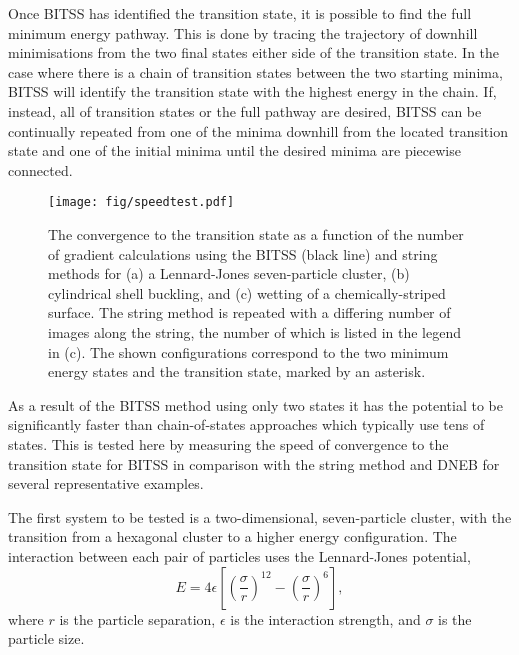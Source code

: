 \documentclass[aps,prl,twocolumn,10pt,groupedaddress]{revtex4-2}
\begin{document}
Once BITSS has identified the transition state, it is possible to find the full minimum energy pathway.
This is done by tracing the trajectory of downhill minimisations from the two final states either side of the transition state.
In the case where there is a chain of transition states between the two starting minima, BITSS will identify the transition state with the highest energy in the chain.
If, instead, all of transition states or the full pathway are desired, BITSS can be continually repeated from one of the minima downhill from the located transition state and one of the initial minima until the desired minima are piecewise connected.


\begin{figure*}[tb]
  \texttt{[image: fig/speedtest.pdf]}
  \caption{\label{fig:speedtest}
    The convergence to the transition state as a function of the number of gradient calculations using the BITSS (black line) and string methods for (a) a Lennard-Jones seven-particle cluster, (b) cylindrical shell buckling, and (c) wetting of a chemically-striped surface.
    The string method is repeated with a differing number of images along the string, the number of which is listed in the legend in (c).
    The shown configurations correspond to the two minimum energy states and the transition state, marked by an asterisk.
  }
\end{figure*}
As a result of the BITSS method using only two states it has the potential to be significantly faster than chain-of-states approaches which typically use tens of states.
This is tested here by measuring the speed of convergence to the transition state for BITSS in comparison with the string method and DNEB for several representative examples.

The first system to be tested is a two-dimensional, seven-particle cluster, with the transition from a hexagonal cluster to a higher energy configuration.
The interaction between each pair of particles uses the Lennard-Jones potential,
\begin{equation}
  E = 4\epsilon \left[ \left(\frac{\sigma}{r}\right)^{12} - \left(\frac{\sigma}{r}\right)^6 \right],
\end{equation}
where $r$ is the particle separation, $\epsilon$ is the interaction strength, and $\sigma$ is the particle size.
\end{document}
